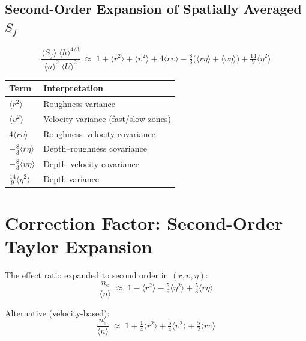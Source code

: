 \documentclass[11pt]{article}
\newcommand{\avg}[1]{\langle #1 \rangle}
\newcommand{\neff}{n_e}
\newcommand{\Sf}{S_f}
\begin{document}
\subsection{Second-Order Expansion of Spatially Averaged $\Sf$}

\begin{equation}\label{eq:Sf-decomp}
  \frac{\avg{\Sf}\;\avg{h}^{4/3}}{\avg{n}^2\;\avg{U}^2}
  \;\approx\;
  1
  + \avg{r^2}
  + \avg{\upsilon^2}
  + 4\avg{r\upsilon}
  - \tfrac{8}{3}\bigl(\avg{r\eta} + \avg{\upsilon\eta}\bigr)
  + \tfrac{14}{9}\avg{\eta^2}
\end{equation}

\begin{center}
\begin{tabular}{@{}ll@{}}
\toprule
Term & Interpretation \\
\midrule
$\avg{r^2}$            & Roughness variance \\
$\avg{\upsilon^2}$      & Velocity variance (fast/slow zones) \\
$4\avg{r\upsilon}$      & Roughness--velocity covariance \\
$-\tfrac{8}{3}\avg{r\eta}$ & Depth--roughness covariance \\
$-\tfrac{8}{3}\avg{\upsilon\eta}$ & Depth--velocity covariance \\
$\tfrac{14}{9}\avg{\eta^2}$ & Depth variance \\
\bottomrule
\end{tabular}
\end{center}


\section{Correction Factor: Second-Order Taylor Expansion}

The effect ratio expanded to second order in $(r, \upsilon, \eta)$:
\begin{equation}\label{eq:CF1}
  \frac{\neff}{\avg{n}}
  \;\approx\;
  1
  - \avg{r^2}
  - \tfrac{5}{9}\avg{\eta^2}
  + \tfrac{5}{3}\avg{r\eta}
\end{equation}

Alternative (velocity-based):
\begin{equation}\label{eq:CF2}
  \frac{\neff}{\avg{n}}
  \;\approx\;
  1
  + \tfrac{1}{4}\avg{r^2}
  + \tfrac{5}{4}\avg{\upsilon^2}
  + \tfrac{5}{2}\avg{r\upsilon}
\end{equation}
\end{document}
